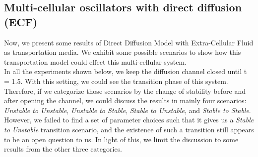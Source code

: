 \documentclass[12pt]{article}
\renewcommand{\(}{\left (}
\renewcommand{\)}{\right )}
\begin{document}
\subsection{Multi-cellular oscillators with direct diffusion (ECF)}
\hspace{5mm} Now, we present some results of Direct Diffusion Model with Extra-Cellular Fluid as transportation media. We exhibit some possible scenarios to show how this transportation model could effect this multi-cellular system. \\

In all the experiments shown below, we keep the diffusion channel closed until t = 1.5. With this setting, we could see the transition phase of this system. \\

Therefore, if we categorize those scenarios by the change of stability before and after opening the channel, we could discuss the results in mainly four scenarios: \textit{Unstable to Unstable}, \textit{Unstable to Stable}, \textit{Stable to Unstable}, and \textit{Stable to Stable}. However, we failed to find a set of parameter choices such that it gives us a \textit{Stable to Unstable} transition scenario, and the existence of such a  transition still appears to be an open question to us. In light of this, we limit the discussion to some results from the other three categories. \\
\end{document}
